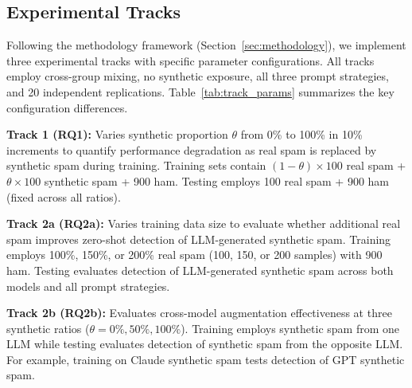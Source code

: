 \subsection{Experimental Tracks}

Following the methodology framework (Section~\ref{sec:methodology}), we implement three experimental tracks with specific parameter configurations. All tracks employ cross-group mixing, no synthetic exposure, all three prompt strategies, and 20 independent replications. Table~\ref{tab:track_params} summarizes the key configuration differences.

\begin{table}[h]
\centering
\caption{Track-Specific Parameters}
\label{tab:track_params}
\small
{}
\end{table}

\textbf{Track 1 (RQ1):} Varies synthetic proportion $\theta$ from 0\% to 100\% in 10\% increments to quantify performance degradation as real spam is replaced by synthetic spam during training. Training sets contain $(1-\theta) \times 100$ real spam + $\theta \times 100$ synthetic spam + 900 ham. Testing employs 100 real spam + 900 ham (fixed across all ratios).

\textbf{Track 2a (RQ2a):} Varies training data size to evaluate whether additional real spam improves zero-shot detection of LLM-generated synthetic spam. Training employs 100\%, 150\%, or 200\% real spam (100, 150, or 200 samples) with 900 ham. Testing evaluates detection of LLM-generated synthetic spam across both models and all prompt strategies.

\textbf{Track 2b (RQ2b):} Evaluates cross-model augmentation effectiveness at three synthetic ratios ($\theta = 0\%, 50\%, 100\%$). Training employs synthetic spam from one LLM while testing evaluates detection of synthetic spam from the opposite LLM. For example, training on Claude synthetic spam tests detection of GPT synthetic spam.

